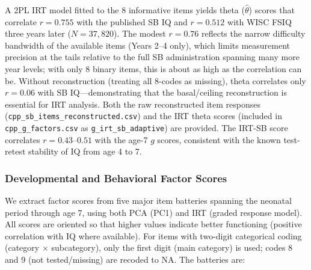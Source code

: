 \documentclass[12pt]{article}
\begin{document}
A 2PL IRT model fitted to the 8 informative items yields theta ($\hat{\theta}$) scores that correlate $r = 0.755$ with the published SB IQ and $r = 0.512$ with WISC FSIQ three years later ($N = 37{,}820$). The modest $r = 0.76$ reflects the narrow difficulty bandwidth of the available items (Years 2--4 only), which limits measurement precision at the tails relative to the full SB administration spanning many more year levels; with only 8 binary items, this is about as high as the correlation can be. Without reconstruction (treating all 8-codes as missing), theta correlates only $r = 0.06$ with SB IQ---demonstrating that the basal/ceiling reconstruction is essential for IRT analysis. Both the raw reconstructed item responses (\texttt{cpp\_sb\_items\_reconstructed.csv}) and the IRT theta scores (included in \texttt{cpp\_g\_factors.csv} as \texttt{g\_irt\_sb\_adaptive}) are provided. The IRT-SB score correlates $r = 0.43$--$0.51$ with the age-7 $g$ scores, consistent with the known test-retest stability of IQ from age 4 to 7.

\subsubsection{Developmental and Behavioral Factor Scores}

We extract factor scores from five major item batteries spanning the neonatal period through age 7, using both PCA (PC1) and IRT (graded response model). All scores are oriented so that higher values indicate better functioning (positive correlation with IQ where available). For items with two-digit categorical coding (category $\times$ subcategory), only the first digit (main category) is used; codes 8 and 9 (not tested/missing) are recoded to NA. The batteries are:
\end{document}
